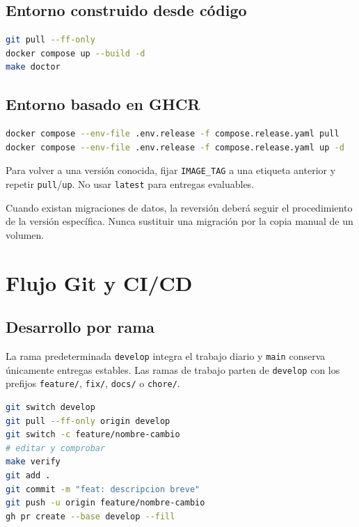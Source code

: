 \documentclass[11pt,letterpaper]{article}
\newcommand{\file}[1]{\texttt{#1}}
\begin{document}
\subsection{Entorno construido desde código}

\begin{lstlisting}[style=terminal,language=bash]
git pull --ff-only
docker compose up --build -d
make doctor
\end{lstlisting}

\subsection{Entorno basado en GHCR}

\begin{lstlisting}[style=terminal,language=bash]
docker compose --env-file .env.release -f compose.release.yaml pull
docker compose --env-file .env.release -f compose.release.yaml up -d
\end{lstlisting}

Para volver a una versión conocida, fijar \file{IMAGE\_TAG} a una etiqueta anterior y repetir \file{pull}/\file{up}. No usar \file{latest} para entregas evaluables.

Cuando existan migraciones de datos, la reversión deberá seguir el procedimiento de la versión específica. Nunca sustituir una migración por la copia manual de un volumen.

\section{Flujo Git y CI/CD}

\subsection{Desarrollo por rama}

La rama predeterminada \file{develop} integra el trabajo diario y \file{main} conserva únicamente entregas estables. Las ramas de trabajo parten de \file{develop} con los prefijos \file{feature/}, \file{fix/}, \file{docs/} o \file{chore/}.

\begin{lstlisting}[style=terminal,language=bash]
git switch develop
git pull --ff-only origin develop
git switch -c feature/nombre-cambio
# editar y comprobar
make verify
git add .
git commit -m "feat: descripcion breve"
git push -u origin feature/nombre-cambio
gh pr create --base develop --fill
\end{lstlisting}
\end{document}
